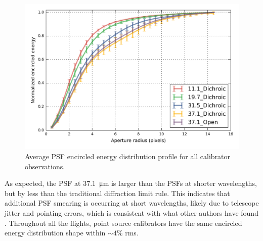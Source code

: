 \begin{figure}[!h]
\begin{center}
\includegraphics[width=\textwidth]{Figures/average.png}
\vspace{-0.5cm}
\caption[PSF size]{Average PSF encircled energy distribution profile for all calibrator observations.}
\label{fig:averageEE}
\end{center}
\end{figure}


As expected, the PSF at \SI{37.1}{\micro\meter} is larger than the PSFs at shorter wavelengths, but by less than the traditional diffraction limit rule. This indicates that additional PSF smearing is occurring at short wavelengths, likely due to telescope jitter and pointing errors, which is consistent with what other authors have found \citep[e.g.][]{Herter:2013by}. Throughout all the flights, point source calibrators have the same encircled energy distribution shape within $\sim 4\%$ rms. 

